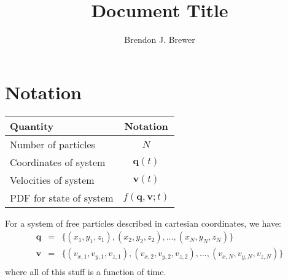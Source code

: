 \documentclass[a4paper, 11pt]{article}
\title{Document Title}
\author{Brendon J. Brewer}
\begin{document}
\maketitle

\section{Notation}

\begin{table}[h!]
\begin{center}
\begin{tabular}{|l|c|}
\hline
{\bf Quantity} & {\bf Notation}\\
\hline
Number of particles & $N$\\
Coordinates of system & $\mathbf{q}(t)$\\
Velocities of system  & $\mathbf{v}(t)$\\
PDF for state of system & $f(\mathbf{q}, \mathbf{v}; t)$\\
\hline
\end{tabular}
\end{center}
\end{table}

For a system of free particles described in cartesian coordinates, we have:
\begin{eqnarray}
\mathbf{q} &=& \{(x_1, y_1, z_1), (x_2, y_2, z_2), ..., (x_N, y_N, z_N)\}\\
\mathbf{v} &=& \{(v_{x,1}, v_{y,1}, v_{z,1}), (v_{x,2}, v_{y,2}, v_{z,2}), ..., (v_{x,N}, v_{y,N}, v_{z,N})\}\\
\end{eqnarray}
where all of this stuff is a function of time.
\end{document}

